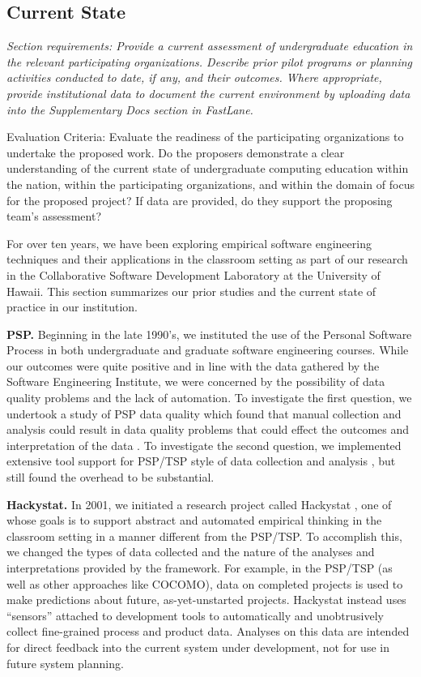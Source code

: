 \subsection{Current State}
\label{sec:current-state}

{\em Section requirements: Provide a current assessment of undergraduate
education in the relevant participating organizations.  Describe prior
pilot programs or planning activities conducted to date, if any, and their
outcomes.  Where appropriate, provide institutional data to document the
current environment by uploading data into the Supplementary Docs section
in FastLane.

Evaluation Criteria: Evaluate the readiness of the participating
organizations to undertake the proposed work.  Do the proposers demonstrate
a clear understanding of the current state of undergraduate computing
education within the nation, within the participating organizations, and
within the domain of focus for the proposed project?  If data are provided,
do they support the proposing team's assessment?}
\bigskip

For over ten years, we have been exploring empirical software engineering
techniques and their applications in the classroom setting as part of our
research in the Collaborative Software Development Laboratory at the
University of Hawaii.  This section summarizes our prior studies and the
current state of practice in our institution.

{\bf PSP.} Beginning in the late 1990's, we instituted the use
of the Personal Software Process in both undergraduate and graduate
software engineering courses.  While our outcomes were quite positive and
in line with the data gathered by the Software Engineering Institute, we
were concerned by the possibility of data quality problems and the lack of
automation.  To investigate the first question, we undertook a study of PSP
data quality which found that manual collection and analysis could result
in data quality problems that could effect the outcomes and interpretation
of the data \citep{csdl-98-13,csdl-98-11}.  To investigate the second question, we
implemented extensive tool support for PSP/TSP style of data collection and
analysis \citep{csdl2-00-03}, but still found the overhead to be
substantial\citep{csdl2-01-12}. 

{\bf Hackystat.} In 2001, we initiated a research project called Hackystat
\citep{csdl2-06-06,csdl2-04-11,csdl2-02-07}, one of whose goals is to
support abstract and automated empirical thinking in the classroom setting
in a manner different from the PSP/TSP.  To accomplish this, we changed the
types of data collected and the nature of the analyses and interpretations
provided by the framework.  For example, in the PSP/TSP (as well as other
approaches like COCOMO), data on completed projects is used to make
predictions about future, as-yet-unstarted projects. Hackystat
instead uses ``sensors'' attached to development tools to automatically and
unobtrusively collect fine-grained process and product data. Analyses on
this data are intended for direct feedback into the current system under
development, not for use in future system planning.

